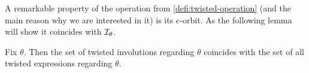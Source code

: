 A remarkable property of the operation from \ref{defi:twisted-operation} (and the main reason why we are interested in it) is its $e$-orbit. As the following lemma will show it coincides with $\mathcal{I}_{\theta}$.

\begin{lemm}
	Fix $\theta$. Then the set of twisted involutions regarding $\theta$ coincides with the set of all twisted expressions regarding $\theta$. 
\end{lemm}